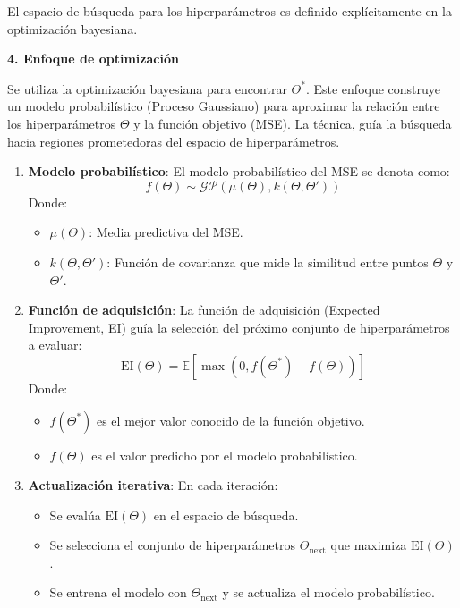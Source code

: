 \documentclass[
  12pt,
  letterpaper,
  DIV=11,
  numbers=noendperiod]{scrartcl}
\providecommand{\tightlist}{%
  \setlength{\itemsep}{0pt}\setlength{\parskip}{0pt}}\usepackage{longtable,booktabs,array}
\begin{document}
El espacio de búsqueda para los hiperparámetros es definido
explícitamente en la optimización bayesiana.

\textbf{4. Enfoque de optimización}

Se utiliza la optimización bayesiana para encontrar \(\Theta^*\). Este
enfoque construye un modelo probabilístico (Proceso Gaussiano) para
aproximar la relación entre los hiperparámetros \(\Theta\) y la función
objetivo (MSE). La técnica, guía la búsqueda hacia regiones prometedoras
del espacio de hiperparámetros.

\begin{enumerate}
\def\labelenumi{\arabic{enumi}.}
\tightlist
\item
  \textbf{Modelo probabilístico}: El modelo probabilístico del MSE se
  denota como: \[
  f(\Theta) \sim \mathcal{GP}(\mu(\Theta), k(\Theta, \Theta'))
  \] Donde:

  \begin{itemize}
  \tightlist
  \item
    \(\mu(\Theta)\): Media predictiva del MSE.
  \item
    \(k(\Theta, \Theta')\): Función de covarianza que mide la similitud
    entre puntos \(\Theta\) y \(\Theta'\).
  \end{itemize}
\item
  \textbf{Función de adquisición}: La función de adquisición (Expected
  Improvement, EI) guía la selección del próximo conjunto de
  hiperparámetros a evaluar: \[
  \text{EI}(\Theta) = \mathbb{E}\left[ \max(0, f(\Theta^*) - f(\Theta)) \right]
  \] Donde:

  \begin{itemize}
  \tightlist
  \item
    \(f(\Theta^*)\) es el mejor valor conocido de la función objetivo.
  \item
    \(f(\Theta)\) es el valor predicho por el modelo probabilístico.
  \end{itemize}
\item
  \textbf{Actualización iterativa}: En cada iteración:

  \begin{itemize}
  \tightlist
  \item
    Se evalúa \(\text{EI}(\Theta)\) en el espacio de búsqueda.
  \item
    Se selecciona el conjunto de hiperparámetros
    \(\Theta_{\text{next}}\) que maximiza \(\text{EI}(\Theta)\).
  \item
    Se entrena el modelo con \(\Theta_{\text{next}}\) y se actualiza el
    modelo probabilístico.
  \end{itemize}
\end{enumerate}
\end{document}
